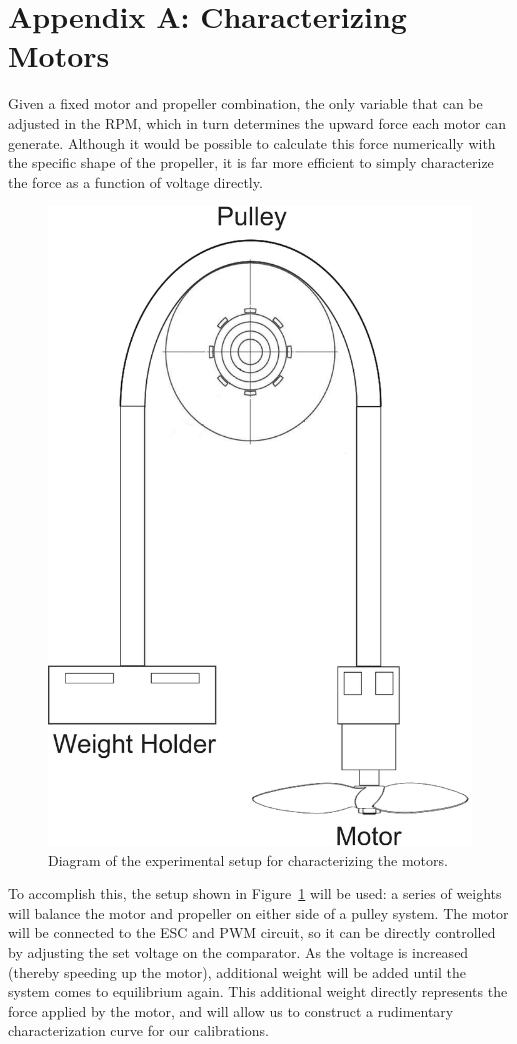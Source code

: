 \documentclass[11pt]{article} %
\begin{document}
\section{Appendix A: Characterizing Motors}
\FloatBarrier
Given a fixed motor and propeller combination, the only variable that can be adjusted in the RPM, which in turn determines the upward force each motor can generate. Although it would be possible to calculate this force numerically with the specific shape of the propeller, it is far more efficient to simply characterize the force as a function of voltage directly.\\
\begin{figure}[h]
\centering
\includegraphics[width=.5\textwidth]{ExperimentalSetup.eps}
\caption{Diagram of the experimental setup for characterizing the motors.}
\label{fig:motor}
\end{figure}

To accomplish this, the setup shown in Figure~\ref{fig:motor} will be used: a series of weights will balance the motor and propeller on either side of a pulley system. The motor will be connected to the ESC and PWM circuit, so it can be directly controlled by adjusting the set voltage on the comparator. As the voltage is increased (thereby speeding up the motor), additional weight will be added until the system comes to equilibrium again. This additional weight directly represents the force applied by the motor, and will allow us to construct a rudimentary characterization curve for our calibrations.
\end{document}
